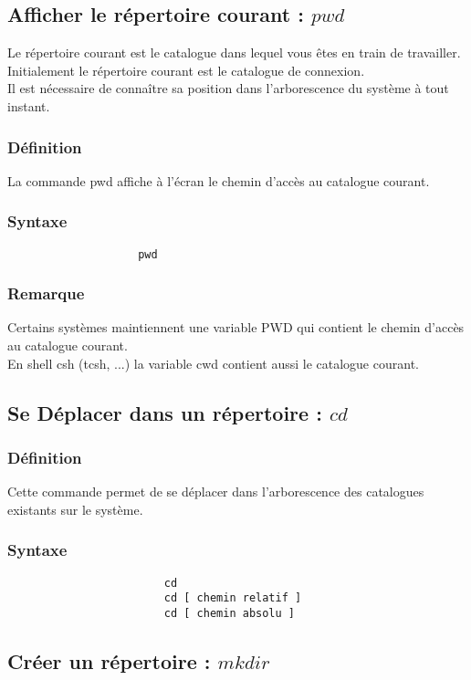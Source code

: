 			\subsection{Afficher le répertoire courant : $pwd$}
			Le répertoire courant est le catalogue dans lequel vous êtes en train de travailler.\\
			Initialement le répertoire courant est le catalogue de connexion.\\
			Il est nécessaire de connaître sa position dans l'arborescence du système à tout instant.
				\subsubsection{Définition}
					La commande pwd affiche à l'écran le chemin d'accès au catalogue courant.
				\subsubsection{Syntaxe}
					\begin{verbatim}				
					pwd
					\end{verbatim}
				\subsubsection{Remarque}
					Certains systèmes maintiennent une variable PWD qui contient le chemin d'accès au catalogue courant.\\
					En shell csh (tcsh, ...) la variable cwd contient aussi le catalogue courant.
			\subsection{Se Déplacer dans un répertoire : $cd$}
				\subsubsection{Définition}
					Cette commande permet de se déplacer dans l'arborescence des catalogues existants sur le système.
				\subsubsection{Syntaxe}
					\begin{verbatim}
						cd
						cd [ chemin relatif ] 
						cd [ chemin absolu ] 
					\end{verbatim}
			\subsection{Créer un répertoire : $mkdir$}
